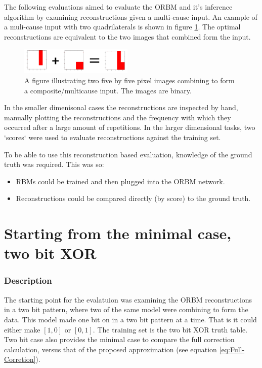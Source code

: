 The following evaluations aimed to evaluate the ORBM and it's inference algorithm by examining reconstructions given a multi-cause input. An example of a muli-cause input with two quadrilaterals is shown in figure \ref{F:Composite-Example}. The optimal reconstructions are equivalent to the two images that combined form the input.

\begin{figure}
  \begin{center}
    \includegraphics[width=0.48\textwidth]{Assets/Composite-Example.png}
  \end{center}
  \caption{A figure illustrating two five by five pixel images combining to form a composite/multicause input. The images are binary.}
  \label{F:Composite-Example}
\end{figure}

In the smaller dimenisonal cases the reconstructions are inspected by hand, manually plotting the reconstructions and the frequency with which they occurred after a large amount of repetitions. In the larger dimensional tasks, two `scores` were used to evaluate reconstructions against the training set.

To be able to use this reconstruction based evaluation, knowledge of the ground truth was required. This was so:
\begin{itemize}
  \item RBMs could be trained and then plugged into the ORBM network.
  \item Reconstructions could be compared directly (by score) to the ground truth.
\end{itemize}

\section{Starting from the minimal case, two bit XOR }

\subsubsection{Description}

The starting point for the evalatuion was examining the ORBM reconstructions in a two bit pattern, where two of the same model were combining to form the data. This model made one bit on in a two bit pattern at a time. That is it could either make $[1 , 0]$ or $[0 , 1]$. The training set is the two bit XOR truth table. Two bit case also provides the minimal case to compare the full correction calculation, versus that of the proposed approximation (see equation \ref{eq:Full-Corretion}).


